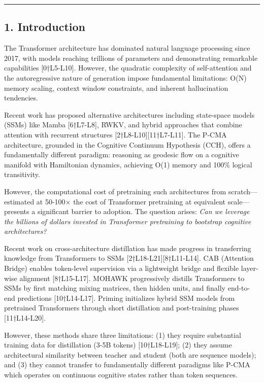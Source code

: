 \documentclass[
  11pt,
  a4paper,
]{article}
\begin{document}
\begin{center}\rule{0.5\linewidth}{0.5pt}\end{center}

\subsection{1. Introduction}\label{introduction}

The Transformer architecture has dominated natural language processing
since 2017, with models reaching trillions of parameters and
demonstrating remarkable capabilities {[}0†L5-L10{]}. However, the
quadratic complexity of self-attention and the autoregressive nature of
generation impose fundamental limitations: O(N) memory scaling, context
window constraints, and inherent hallucination tendencies.

Recent work has proposed alternative architectures including state-space
models (SSMs) like Mamba {[}6†L7-L8{]}, RWKV, and hybrid approaches that
combine attention with recurrent structures
{[}2†L8-L10{]}{[}11†L7-L11{]}. The P-CMA architecture, grounded in the
Cognitive Continuum Hypothesis (CCH), offers a fundamentally different
paradigm: reasoning as geodesic flow on a cognitive manifold with
Hamiltonian dynamics, achieving O(1) memory and 100\% logical
transitivity.

However, the computational cost of pretraining such architectures from
scratch---estimated at 50-100× the cost of Transformer pretraining at
equivalent scale---presents a significant barrier to adoption. The
question arises: \emph{Can we leverage the billions of dollars invested
in Transformer pretraining to bootstrap cognitive architectures?}

Recent work on cross-architecture distillation has made progress in
transferring knowledge from Transformers to SSMs
{[}2†L18-L21{]}{[}8†L11-L14{]}. CAB (Attention Bridge) enables
token-level supervision via a lightweight bridge and flexible layer-wise
alignment {[}8†L15-L17{]}. MOHAWK progressively distills Transformers to
SSMs by first matching mixing matrices, then hidden units, and finally
end-to-end predictions {[}10†L14-L17{]}. Priming initializes hybrid SSM
models from pretrained Transformers through short distillation and
post-training phases {[}11†L14-L20{]}.

However, these methods share three limitations: (1) they require
substantial training data for distillation (3-5B tokens)
{[}10†L18-L19{]}; (2) they assume architectural similarity between
teacher and student (both are sequence models); and (3) they cannot
transfer to fundamentally different paradigms like P-CMA which operates
on continuous cognitive states rather than token sequences.
\end{document}
